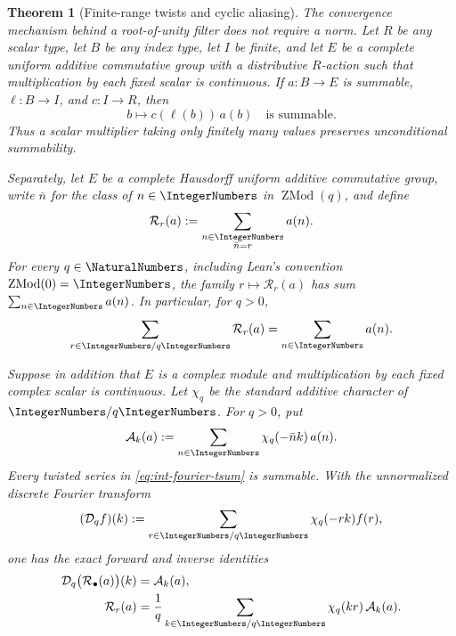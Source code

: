 \documentclass[11pt,oneside]{article}
\newtheorem{theorem}{Theorem}[section]
\theoremstyle{definition}
\theoremstyle{remark}
\begin{document}
\begin{theorem}[Finite-range twists and cyclic aliasing]
\label{thm:summable-cyclic-alias}
The convergence mechanism behind a root-of-unity filter does not require a
norm.  Let \(R\) be any scalar type, let \(B\) be any index type, let \(I\)
be finite, and let \(E\) be a complete uniform additive commutative group
with a distributive \(R\)-action such that multiplication by each fixed
scalar is continuous.  If \(a:B\to E\) is summable, \(\ell:B\to I\), and
\(c:I\to R\), then
\begin{equation}
 b\longmapsto c(\ell(b))\,a(b)
 \quad\text{is summable}.                                \label{eq:finite-range-scalar-twist}
\end{equation}
Thus a scalar multiplier taking only finitely many values preserves
unconditional summability.

Separately, let \(E\) be a complete Hausdorff uniform additive commutative
group, write \(\bar n\) for the class of \(n\in\IntegerNumbers\) in
\(\operatorname{ZMod}(q)\), and define
\begin{equation}
 \mathcal R_r(a):=
 \sum_{\substack{n\in\IntegerNumbers\\\bar n=r}}a(n).                \label{eq:int-residue-tsum}
\end{equation}
For every \(q\in\NaturalNumbers\), including Lean's convention
\(\operatorname{ZMod}(0)=\IntegerNumbers\), the family
\(r\mapsto\mathcal R_r(a)\) has sum \(\sum_{n\in\IntegerNumbers}a(n)\).
In particular, for \(q>0\),
\begin{equation}
 \sum_{r\in\IntegerNumbers/q\IntegerNumbers}\mathcal R_r(a)=\sum_{n\in\IntegerNumbers}a(n).
                                                               \label{eq:sum-int-residue-tsum}
\end{equation}

Suppose in addition that \(E\) is a complex module and multiplication by each
fixed complex scalar is continuous.  Let \(\chi_q\) be the standard additive
character of \(\IntegerNumbers/q\IntegerNumbers\).  For \(q>0\), put
\begin{equation}
 \mathcal A_k(a):=
 \sum_{n\in\IntegerNumbers}\chi_q(-\bar n k)\,a(n).                  \label{eq:int-fourier-tsum}
\end{equation}
Every twisted series in \eqref{eq:int-fourier-tsum} is summable.  With the
unnormalized discrete Fourier transform
\[
 (\mathcal D_qf)(k):=
 \sum_{r\in\IntegerNumbers/q\IntegerNumbers}\chi_q(-rk)f(r),
\]
one has the exact forward and inverse identities
\begin{align}
 \mathcal D_q\bigl(\mathcal R_\bullet(a)\bigr)(k)
   &=\mathcal A_k(a),                                    \label{eq:dft-int-residue-tsum}\\
 \mathcal R_r(a)
   &=\frac1q\sum_{k\in\IntegerNumbers/q\IntegerNumbers}
       \chi_q(kr)\,\mathcal A_k(a).                      \label{eq:int-residue-dft-average}
\end{align}
\end{theorem}
\end{document}
